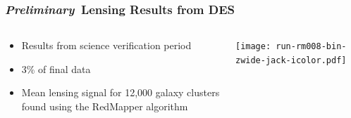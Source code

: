 \documentclass{beamer}
\newcommand{\prelim}{{\bf{\it Preliminary}}}
\begin{document}
\frame
{

    \frametitle{\prelim\ Lensing Results from DES}

 
    \begin{columns}
        \begin{column}{0.5\textwidth}    
            \begin{itemize}

                \item Results from science verification period

                \item {\color{gold} 3\% of final data }

                \item Mean lensing signal for 12,000 galaxy clusters found
                    using the RedMapper algorithm

            \end{itemize}
        \end{column}
        \begin{column}{0.5\textwidth}
            \begin{center}
                \texttt{[image: run-rm008-bin-zwide-jack-icolor.pdf]}
                \newline
            \end{center}
        \end{column}
    \end{columns}

}

\end{document}
